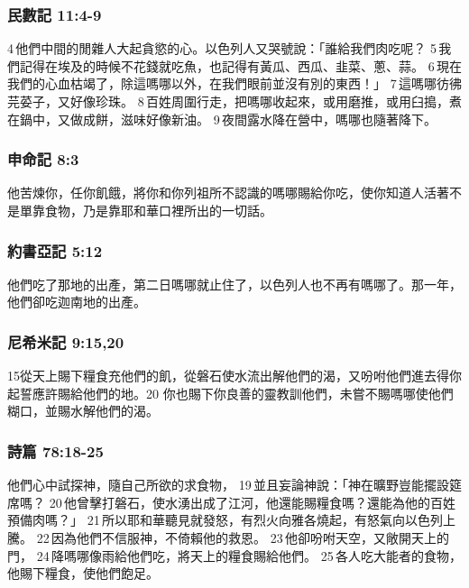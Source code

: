 \subsubsection{民數記 11:4-9}
4 他們中間的閒雜人大起貪慾的心。以色列人又哭號說：「誰給我們肉吃呢？ 5 我們記得在埃及的時候不花錢就吃魚，也記得有黃瓜、西瓜、韭菜、蔥、蒜。 6 現在我們的心血枯竭了，除這嗎哪以外，在我們眼前並沒有別的東西！」 7 這嗎哪彷彿芫荽子，又好像珍珠。 8 百姓周圍行走，把嗎哪收起來，或用磨推，或用臼搗，煮在鍋中，又做成餅，滋味好像新油。 9 夜間露水降在營中，嗎哪也隨著降下。


\subsubsection{申命記 8:3}
他苦煉你，任你飢餓，將你和你列祖所不認識的嗎哪賜給你吃，使你知道人活著不是單靠食物，乃是靠耶和華口裡所出的一切話。

\subsubsection{約書亞記 5:12}
他們吃了那地的出產，第二日嗎哪就止住了，以色列人也不再有嗎哪了。那一年，他們卻吃迦南地的出產。

\subsubsection{尼希米記 9:15,20}
15從天上賜下糧食充他們的飢，從磐石使水流出解他們的渴，又吩咐他們進去得你起誓應許賜給他們的地。20 你也賜下你良善的靈教訓他們，未嘗不賜嗎哪使他們糊口，並賜水解他們的渴。

\subsubsection{詩篇 78:18-25}
他們心中試探神，隨自己所欲的求食物，
19 並且妄論神說：「神在曠野豈能擺設筵席嗎？
20 他曾擊打磐石，使水湧出成了江河，他還能賜糧食嗎？還能為他的百姓預備肉嗎？」
21 所以耶和華聽見就發怒，有烈火向雅各燒起，有怒氣向以色列上騰。
22 因為他們不信服神，不倚賴他的救恩。
23 他卻吩咐天空，又敞開天上的門，
24 降嗎哪像雨給他們吃，將天上的糧食賜給他們。
25 各人吃大能者的食物，他賜下糧食，使他們飽足。

